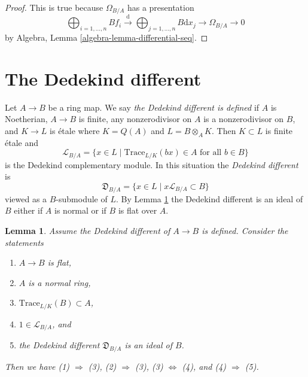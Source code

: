 \documentclass{stacks-project}
\theoremstyle{plain}
\newtheorem{lemma}[subsection]{Lemma}
\theoremstyle{definition}
\theoremstyle{remark}
\numberwithin{equation}{subsection}
\begin{document}
\begin{proof}
This is true because $\Omega_{B/A}$ has a presentation
$$
\bigoplus\nolimits_{i = 1, \ldots, n} B f_i
\xrightarrow{\text{d}}
\bigoplus\nolimits_{j = 1, \ldots, n} B \text{d}x_j
\rightarrow \Omega_{B/A} \rightarrow 0
$$
by Algebra, Lemma \ref{algebra-lemma-differential-seq}.
\end{proof}



\section{The Dedekind different}
\label{section-dedekind-different}

\noindent
Let $A \to B$ be a ring map. We say {\it the Dedekind different is defined}
if $A$ is Noetherian, $A \to B$ is finite,
any nonzerodivisor on $A$ is a nonzerodivisor on $B$, and $K \to L$ is
\'etale where $K = Q(A)$ and $L = B \otimes_A K$. Then $K \subset L$ is
finite \'etale and
$$
\mathcal{L}_{B/A} = \{x \in L \mid \text{Trace}_{L/K}(bx) \in A
\text{ for all }b \in B\}
$$
is the Dedekind complementary module. In this situation the
{\it Dedekind different} is
$$
\mathfrak{D}_{B/A} = \{x \in L \mid x\mathcal{L}_{B/A} \subset B\}
$$
viewed as a $B$-submodule of $L$.
By Lemma \ref{lemma-dedekind-different-ideal} the Dedekind different is an
ideal of $B$ either if $A$ is normal or if $B$ is flat over $A$.

\begin{lemma}
\label{lemma-dedekind-different-ideal}
Assume the Dedekind different of $A \to B$ is defined. Consider the statements
\begin{enumerate}
\item $A \to B$ is flat,
\item $A$ is a normal ring,
\item $\text{Trace}_{L/K}(B) \subset A$,
\item $1 \in \mathcal{L}_{B/A}$, and
\item the Dedekind different $\mathfrak{D}_{B/A}$ is an ideal of $B$.
\end{enumerate}
Then we have (1) $\Rightarrow$ (3), (2) $\Rightarrow$ (3),
(3) $\Leftrightarrow$ (4), and (4) $\Rightarrow$ (5).
\end{lemma}
\end{document}
